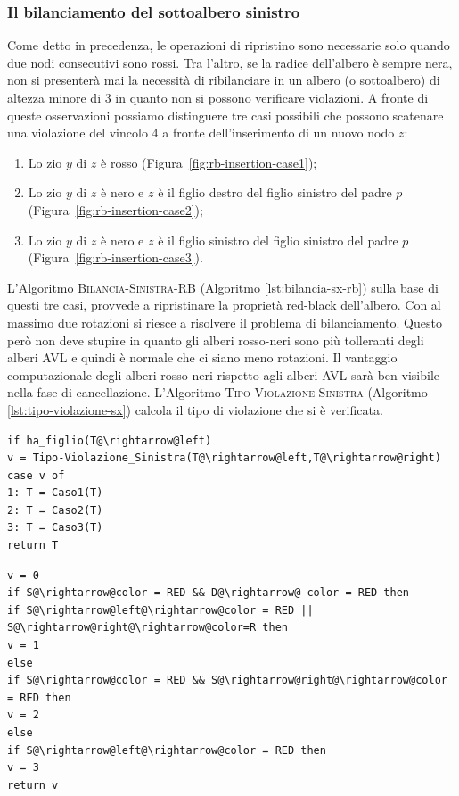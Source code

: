 \subsubsection{Il bilanciamento del sottoalbero sinistro}
Come detto in precedenza, le operazioni di ripristino sono necessarie solo quando due nodi consecutivi sono rossi. Tra l'altro, se la radice dell'albero è sempre nera, non si presenterà mai la necessità di ribilanciare in un albero (o sottoalbero) di altezza minore di 3 in quanto non si possono verificare violazioni. A fronte di queste osservazioni possiamo distinguere tre casi possibili che possono scatenare una violazione del vincolo 4 a fronte dell'inserimento di un nuovo nodo $z$:
\begin{enumerate}
\item Lo zio $y$ di $z$ è rosso (Figura~\ref{fig:rb-insertion-case1});
\item Lo zio $y$ di $z$ è nero e $z$ è il figlio destro del figlio sinistro del padre $p$ (Figura~\ref{fig:rb-insertion-case2});
\item Lo zio $y$ di $z$ è nero e $z$ è il figlio sinistro del figlio sinistro del padre $p$ (Figura~\ref{fig:rb-insertion-case3}).
\end{enumerate}
L'Algoritmo \textsc{Bilancia-Sinistra-RB} (Algoritmo \ref{lst:bilancia-sx-rb}) sulla base di questi tre casi, provvede a ripristinare la proprietà red-black dell'albero. Con al massimo due rotazioni si riesce a risolvere il problema di bilanciamento. Questo però non deve stupire in quanto gli alberi rosso-neri sono più tolleranti degli alberi AVL e quindi è normale che ci siano meno rotazioni. Il vantaggio computazionale degli alberi rosso-neri rispetto agli alberi AVL sarà ben visibile nella fase di cancellazione. L'Algoritmo \textsc{Tipo-Violazione-Sinistra} (Algoritmo \ref{lst:tipo-violazione-sx}) calcola il tipo di violazione che si è verificata.

\begin{lstlisting}[language=asd,caption={Bilancia-Sinistra-RB(T)},label=lst:bilancia-sx-rb]
if ha_figlio(T@\rightarrow@left)
v = Tipo-Violazione_Sinistra(T@\rightarrow@left,T@\rightarrow@right)
case v of
1: T = Caso1(T)
2: T = Caso2(T)
3: T = Caso3(T)
return T
\end{lstlisting}


\begin{lstlisting}[language=asd,caption={Tipo-Violazione-Sinistra(S,D)},label=lst:tipo-violazione-sx]
v = 0
if S@\rightarrow@color = RED && D@\rightarrow@ color = RED then
if S@\rightarrow@left@\rightarrow@color = RED || S@\rightarrow@right@\rightarrow@color=R then
v = 1
else
if S@\rightarrow@color = RED && S@\rightarrow@right@\rightarrow@color = RED then
v = 2
else
if S@\rightarrow@left@\rightarrow@color = RED then
v = 3
return v
\end{lstlisting}

